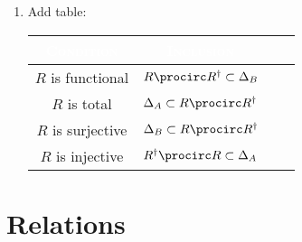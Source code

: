 \begin{enumerate}
    \item Add table:
        \begingroup%
        \setlength\cellspacetoplimit{3pt}
        \setlength\cellspacebottomlimit{3pt}
        \renewcommand{\arraystretch}{1.2}
        \begin{center}
            \begin{tabular}{|Sc|Sc|}\\\hline{}
                \textcolor{white}{\textbf{\textsc{Condition}}} & \textcolor{white}{\textbf{\textsc{Inclusion}}}       \\\hline{}
                $R$ is functional                              & $R\procirc R^{\dagger}\subset \Delta_{B}$            \\
                $R$ is total                                   & $\Delta_{A}           \subset R\procirc R^{\dagger}$ \\
                $R$ is surjective                              & $\Delta_{B}           \subset R\procirc R^{\dagger}$ \\
                $R$ is injective                               & $R^{\dagger}\procirc R\subset \Delta_{A}$            \\\hline
            \end{tabular}
        \end{center}
        \endgroup
\end{enumerate}

\ChapterTableOfContents

\section{Relations}\label{section-relations}
